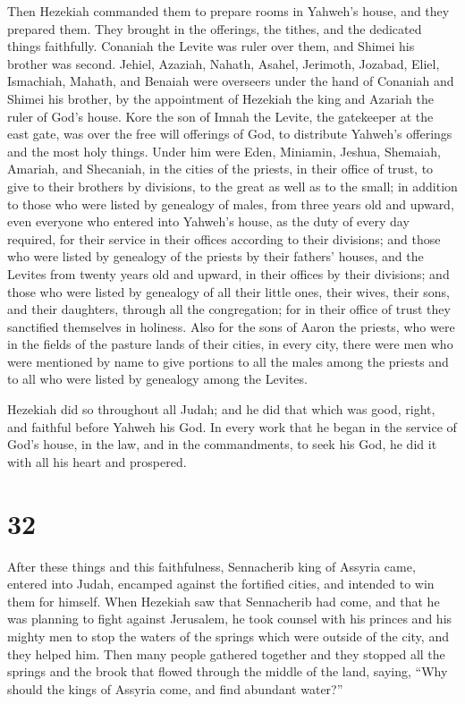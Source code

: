  Then Hezekiah commanded them to prepare rooms in
Yahweh's house, and they prepared them.  They brought in
the offerings, the tithes, and the dedicated things faithfully. Conaniah
the Levite was ruler over them, and Shimei his brother was second.
 Jehiel, Azaziah, Nahath, Asahel, Jerimoth, Jozabad,
Eliel, Ismachiah, Mahath, and Benaiah were overseers under the hand of
Conaniah and Shimei his brother, by the appointment of Hezekiah the king
and Azariah the ruler of God's house.  Kore the son of
Imnah the Levite, the gatekeeper at the east gate, was over the free
will offerings of God, to distribute Yahweh's offerings and the most
holy things.  Under him were Eden, Miniamin, Jeshua,
Shemaiah, Amariah, and Shecaniah, in the cities of the priests, in their
office of trust, to give to their brothers by divisions, to the great as
well as to the small;  in addition to those who were
listed by genealogy of males, from three years old and upward, even
everyone who entered into Yahweh's house, as the duty of every day
required, for their service in their offices according to their
divisions;  and those who were listed by genealogy of the
priests by their fathers' houses, and the Levites from twenty years old
and upward, in their offices by their divisions;  and
those who were listed by genealogy of all their little ones, their
wives, their sons, and their daughters, through all the congregation;
for in their office of trust they sanctified themselves in holiness.
 Also for the sons of Aaron the priests, who were in the
fields of the pasture lands of their cities, in every city, there were
men who were mentioned by name to give portions to all the males among
the priests and to all who were listed by genealogy among the Levites.

 Hezekiah did so throughout all Judah; and he did that
which was good, right, and faithful before Yahweh his God.
 In every work that he began in the service of God's
house, in the law, and in the commandments, to seek his God, he did it
with all his heart and prospered.

\hypertarget{section-31}{%
\section{32}\label{section-31}}

 After these things and this faithfulness, Sennacherib
king of Assyria came, entered into Judah, encamped against the fortified
cities, and intended to win them for himself.  When
Hezekiah saw that Sennacherib had come, and that he was planning to
fight against Jerusalem,  he took counsel with his princes
and his mighty men to stop the waters of the springs which were outside
of the city, and they helped him.  Then many people
gathered together and they stopped all the springs and the brook that
flowed through the middle of the land, saying, ``Why should the kings of
Assyria come, and find abundant water?''

